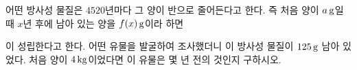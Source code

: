어떤 방사성 물질은 $4520$년마다 그 양이 반으로 줄어든다고 한다. 즉 처음 양이 $a\mkern3mu \mathrm{g}$일 때 $x$년 후에 남아 있는 양을 $f(x)\mkern3mu \mathrm{g}$이라 하면 \par\smallskip{}\par\smallskip\noindent 이 성립한다고 한다. 어떤 유물을 발굴하여 조사했더니 이 방사성 물질이 $125\mkern3mu \mathrm{g}$ 남아 있었다. 처음 양이 $4\mkern3mu \mathrm{kg}$이었다면 이 유물은 몇 년 전의 것인지 구하시오.
